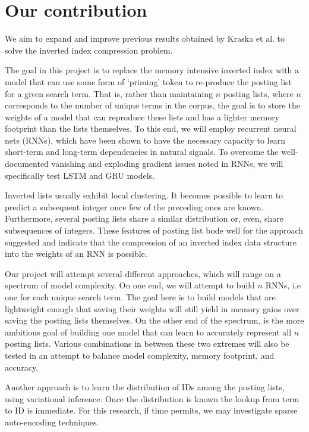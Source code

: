 \documentclass{article}
\begin{document}
\section{Our contribution}
We aim to expand and improve previous results obtained by Kraska et al. \cite{Kraska2018} to solve the inverted index compression problem.

The goal in this project is to replace the memory intensive inverted index with a model that can use some form of `priming' token to re-produce the posting list for a given search term.
That is, rather than maintaining $n$ posting lists, where $n$ corresponds to the number of unique terms in the corpus, the goal is to store the weights of a model that can reproduce these lists and has a lighter memory footprint than the lists themselves.
To this end, we will employ recurrent neural nets (RNNs), which have been shown to have the necessary capacity to learn short-term and long-term dependencies in natural signals.
To overcome the well-documented vanishing and exploding gradient issues noted in RNNs, we will specifically test LSTM and GRU models.

Inverted lists usually exhibit local clustering. It becomes possible to learn to predict a subsequent integer once few of the preceding ones are known. 
Furthermore, several posting lists share a similar distribution or, even, share subsequences of integers.
These features of posting list bode well for the approach suggested and indicate that the compression of an inverted index data structure into the weights of an RNN is possible.


Our project will attempt several different approaches, which will range on a spectrum of model complexity.
On one end, we will attempt to build $n$ RNNs, i.e one for each unique search term. 
The goal here is to build models that are lightweight enough that saving their weights will still yield in memory gains over saving the posting lists themselves.
On the other end of the spectrum, is the more ambitious goal of building one model that can learn to accurately represent all $n$ posting lists.
Various combinations in between these two extremes will also be tested in an attempt to balance model complexity, memory footprint, and accuracy.

Another approach is to learn the distribution of IDs among the posting lists, using variational inference. Once the distribution is known the lookup from term to ID is immediate. For this research, if time permits, we may  investigate sparse auto-encoding techniques.
\end{document}
